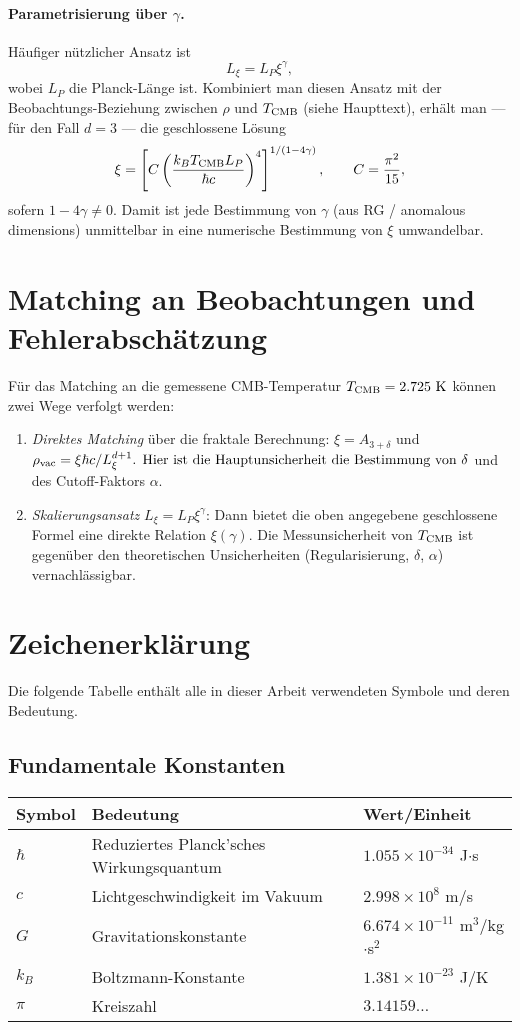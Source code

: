\documentclass[12pt,a4paper]{article}
\begin{document}
	\paragraph{Parametrisierung über \(\gamma\).} Häufiger nützlicher Ansatz ist
	\[
	L_\xi = L_P\xi^{\gamma},
	\]
	wobei \(L_P\) die Planck-Länge ist. Kombiniert man diesen Ansatz mit der Beobachtungs-Beziehung zwischen \(\rho\) und \(T_{\rm CMB}\) (siehe Haupttext), erhält man — für den Fall \(d=3\) — die geschlossene Lösung
	\[
	\xi = \left[ C \left(\frac{k_B T_{\rm CMB} L_P}{\hbar c}\right)^4 \right]^{1/(1-4\gamma)},\qquad C=\frac{\pi^2}{15},
	\]
	sofern \(1-4\gamma\neq 0\). Damit ist jede Bestimmung von \(\gamma\) (aus RG / anomalous dimensions) unmittelbar in eine numerische Bestimmung von \(\xi\) umwandelbar.
	
	\section{Matching an Beobachtungen und Fehlerabschätzung}
	Für das Matching an die gemessene CMB-Temperatur \(T_{\rm CMB}=2.725\ \mathrm{K}\) können zwei Wege verfolgt werden:
	\begin{enumerate}
		\item \emph{Direktes Matching} über die fraktale Berechnung: \(\xi=A_{3+\delta}\) und \(\rho_{\rm vac}=\xi\hbar c/L_\xi^{d+1}$. Hier ist die Hauptunsicherheit die Bestimmung von \(\delta\) und des Cutoff-Faktors \(\alpha\).
		\item \emph{Skalierungsansatz} \(L_\xi=L_P\xi^\gamma\): Dann bietet die oben angegebene geschlossene Formel eine direkte Relation \(\xi(\gamma)\). Die Messunsicherheit von \(T_{\rm CMB}\) ist gegenüber den theoretischen Unsicherheiten (Regularisierung, \(\delta\), \(\alpha\)) vernachlässigbar.
	\end{enumerate}
	
	\section{Zeichenerklärung}
	\label{sec:notation}
	
	Die folgende Tabelle enthält alle in dieser Arbeit verwendeten Symbole und deren Bedeutung.
	
	\subsection{Fundamentale Konstanten}
	\begin{longtable}{p{2.5cm} p{10cm} p{3cm}}
		\toprule
		\textbf{Symbol} & \textbf{Bedeutung} & \textbf{Wert/Einheit} \\
		\midrule
		$\hbar$ & Reduziertes Planck'sches Wirkungsquantum & $1.055 \times 10^{-34}$ J$\cdot$s \\
		$c$ & Lichtgeschwindigkeit im Vakuum & $2.998 \times 10^8$ m/s \\
		$G$ & Gravitationskonstante & $6.674 \times 10^{-11}$ m$^3$/kg$\cdot$s$^2$ \\
		$k_B$ & Boltzmann-Konstante & $1.381 \times 10^{-23}$ J/K \\
		$\pi$ & Kreiszahl & $3.14159\ldots$ \\
		\bottomrule
	\end{longtable}
	
\end{document}
